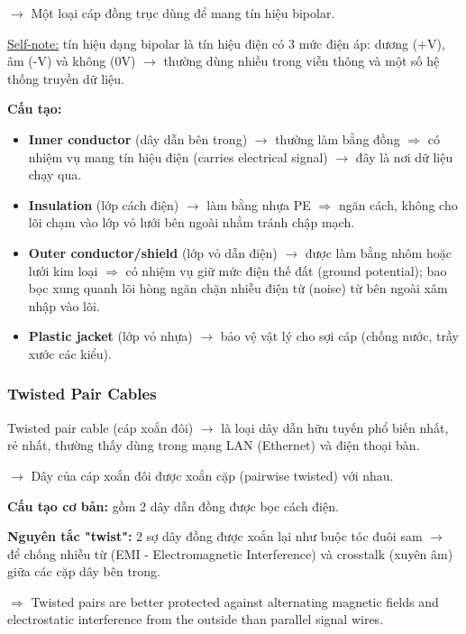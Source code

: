 \noindent
$\rightarrow$ Một loại cáp đồng trục dùng để mang tín hiệu bipolar.
\medskip

\noindent
\underline{Self-note:} tín hiệu dạng bipolar là tín hiệu điện có 3 mức điện áp: dương (+V), âm (-V) và không (0V) $\rightarrow$ thường dùng nhiều trong viễn thông và một số hệ thống truyền dữ liệu.
\medskip

\noindent
\textbf{Cấu tạo:}

\begin{itemize}
    \item \textbf{Inner conductor} (dây dẫn bên trong) $\rightarrow$ thường làm bằng đồng $\Rightarrow$ có nhiệm vụ mang tín hiệu điện (carries electrical signal) $\rightarrow$ đây là nơi dữ liệu chạy qua.
    \item \textbf{Insulation} (lớp cách điện) $\rightarrow$ làm bằng nhựa PE $\Rightarrow$ ngăn cách, không cho lõi chạm vào lớp vỏ lưới bên ngoài nhằm tránh chập mạch.
    \item \textbf{Outer conductor/shield} (lớp vỏ dẫn điện) $\rightarrow$ được làm bằng nhôm hoặc lưới kim loại $\Rightarrow$ có nhiệm vụ giữ mức điện thế đất (ground potential); bao bọc xung quanh lõi hòng ngăn chặn nhiễu điện từ (noise) từ bên ngoài xâm nhập vào lõi.
    \item \textbf{Plastic jacket} (lớp vỏ nhựa) $\rightarrow$ bảo vệ vật lý cho sợi cáp (chống nước, trầy xước các kiểu).
\end{itemize}
\medskip

\subsubsection{Twisted Pair Cables}

\noindent
Twisted pair cable (cáp xoắn đôi) $\rightarrow$ là loại dây dẫn hữu tuyến phổ biến nhất, rẻ nhất, thường thấy dùng trong mạng LAN (Ethernet) và điện thoại bàn.
\medskip

\noindent
$\rightarrow$ Dây của cáp xoắn đôi được xoắn cặp (pairwise twisted) với nhau.
\medskip

\noindent
\textbf{Cấu tạo cơ bản:} gồm 2 dây dẫn đồng được bọc cách điện.
\medskip

\noindent
\textbf{Nguyên tắc "twist":} 2 sợ dây đồng được xoắn lại như buộc tóc đuôi sam $\rightarrow$ để chống nhiễu từ (EMI - Electromagnetic Interference) và crosstalk (xuyên âm) giữa các cặp dây bên trong.

$\Rightarrow$ Twisted pairs are better protected against alternating magnetic fields and electrostatic interference from the outside than parallel signal wires.
\medskip

